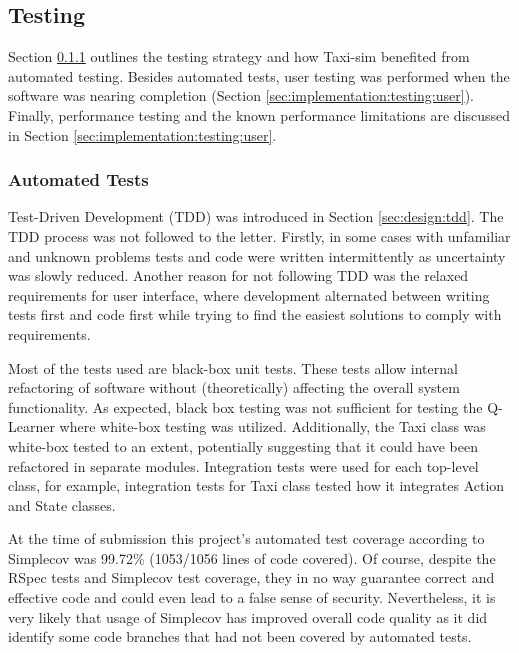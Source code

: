 \subsection{Testing}
\label{sec:implementation:testing}

Section \ref{sec:implementation:testing:automated} outlines the testing
strategy and how Taxi-sim benefited from automated testing. Besides automated
tests, user testing was performed when the software was nearing completion
(Section \ref{sec:implementation:testing:user}). Finally, performance testing
and the known performance limitations are discussed in Section
\ref{sec:implementation:testing:user}.

\subsubsection{Automated Tests}
\label{sec:implementation:testing:automated}

Test-Driven Development (TDD) was introduced in Section \ref{sec:design:tdd}.
The TDD process was not followed to the letter. Firstly, in some cases with
unfamiliar and unknown problems tests and code were written intermittently as
uncertainty was slowly reduced. Another reason for not following TDD was the
relaxed requirements for user interface, where development alternated between
writing tests first and code first while trying to find the easiest solutions
to comply with requirements.

Most of the tests used are black-box unit tests. These tests allow internal
refactoring of software without (theoretically) affecting the overall system
functionality. As expected, black box testing was not sufficient for testing
the Q-Learner where white-box testing was utilized. Additionally, the Taxi
class was white-box tested to an extent, potentially suggesting that it could
have been refactored in separate modules. Integration tests were used for each
top-level class, for example, integration tests for Taxi class tested how it
integrates Action and State classes.

At the time of submission this project's automated test coverage according to
Simplecov was 99.72\% (1053/1056 lines of code covered). Of course, despite the
RSpec tests and Simplecov test coverage, they in no way guarantee correct and
effective code and could even lead to a false sense of security. Nevertheless,
it is very likely that usage of Simplecov has improved overall code quality as
it did identify some code branches that had not been covered by automated
tests.


